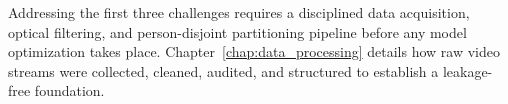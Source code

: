 Addressing the first three challenges requires a disciplined data acquisition, optical filtering, and person-disjoint partitioning pipeline before any model optimization takes place. Chapter~\ref{chap:data_processing} details how raw video streams were collected, cleaned, audited, and structured to establish a leakage-free foundation.
